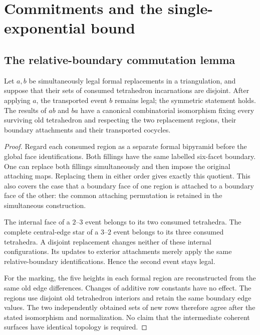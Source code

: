 \section{Commitments and the single-exponential bound}\label{sec:commitments}

\subsection{The relative-boundary commutation lemma}

\begin{lemma}\label{lem:commute}
Let $a,b$ be simultaneously legal formal replacements in a triangulation,
and suppose that their sets of consumed tetrahedron incarnations are disjoint.
After applying $a$, the transported event $b$ remains legal; the symmetric
statement holds. The results of $ab$ and $ba$ have a canonical combinatorial
isomorphism fixing every surviving old tetrahedron and respecting the two
replacement regions, their boundary attachments and their transported cocycles.
\end{lemma}
\begin{proof}
Regard each consumed region as a separate formal bipyramid before the global
face identifications. Both fillings have the same labelled six-facet boundary.
One can replace both fillings simultaneously and then impose the original
attaching maps. Replacing them in either order gives exactly this quotient.
This also covers the case that a boundary face of one region is attached to
a boundary face of the other: the common attaching permutation is retained
in the simultaneous construction.

The internal face of a $2$--$3$ event belongs to its two consumed tetrahedra.
The complete central-edge star of a $3$--$2$ event belongs to its three
consumed tetrahedra. A disjoint replacement changes neither of these internal
configurations. Its updates to exterior attachments merely apply the same
relative-boundary identifications. Hence the second event stays legal.

For the marking, the five heights in each formal region are reconstructed
from the same old edge differences. Changes of additive row constants have
no effect. The regions use disjoint old tetrahedron interiors and retain the
same boundary edge values. The two independently obtained sets of new rows
therefore agree after the stated isomorphism and normalization. No claim
that the intermediate coherent surfaces have identical topology is required.
\end{proof}

